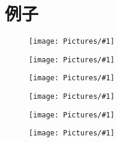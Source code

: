 \renewcommand\chapterimg{Pictures/0.png}
\newcommand{\pic}[1]{\begin{figure}[ht]\centering\texttt{[image: Pictures/\#1]}\end{figure}}

\chapter{例子}

\pic{2_1.eps}

\pic{2_2.eps}

\pic{2_3.eps}

\pic{2_4.eps}

\pic{2_5.eps}

\pic{2_6.eps}